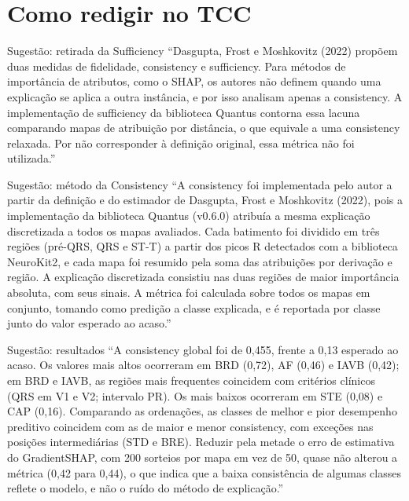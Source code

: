\documentclass[11pt,a4paper]{article}
\begin{document}
\section{Como redigir no TCC}

\begin{infobox}[ok]{Sugestão: retirada da Sufficiency}
“Dasgupta, Frost e Moshkovitz (2022) propõem duas medidas de fidelidade, consistency e sufficiency. Para métodos de importância de atributos, como o SHAP, os autores não definem quando uma explicação se aplica a outra instância, e por isso analisam apenas a consistency. A implementação de sufficiency da biblioteca Quantus contorna essa lacuna comparando mapas de atribuição por distância, o que equivale a uma consistency relaxada. Por não corresponder à definição original, essa métrica não foi utilizada.”
\end{infobox}

\begin{infobox}[ok]{Sugestão: método da Consistency}
“A consistency foi implementada pelo autor a partir da definição e do estimador de Dasgupta, Frost e Moshkovitz (2022), pois a implementação da biblioteca Quantus (v0.6.0) atribuía a mesma explicação discretizada a todos os mapas avaliados. Cada batimento foi dividido em três regiões (pré-QRS, QRS e ST-T) a partir dos picos R detectados com a biblioteca NeuroKit2, e cada mapa foi resumido pela soma das atribuições por derivação e região. A explicação discretizada consistiu nas duas regiões de maior importância absoluta, com seus sinais. A métrica foi calculada sobre todos os mapas em conjunto, tomando como predição a classe explicada, e é reportada por classe junto do valor esperado ao acaso.”
\end{infobox}

\begin{infobox}[ok]{Sugestão: resultados}
“A consistency global foi de 0,455, frente a 0,13 esperado ao acaso. Os valores mais altos ocorreram em BRD (0,72), AF (0,46) e IAVB (0,42); em BRD e IAVB, as regiões mais frequentes coincidem com critérios clínicos (QRS em V1 e V2; intervalo PR). Os mais baixos ocorreram em STE (0,08) e CAP (0,16). Comparando as ordenações, as classes de melhor e pior desempenho preditivo coincidem com as de maior e menor consistency, com exceções nas posições intermediárias (STD e BRE). Reduzir pela metade o erro de estimativa do GradientSHAP, com 200 sorteios por mapa em vez de 50, quase não alterou a métrica (0,42 para 0,44), o que indica que a baixa consistência de algumas classes reflete o modelo, e não o ruído do método de explicação.”
\end{infobox}
\end{document}
